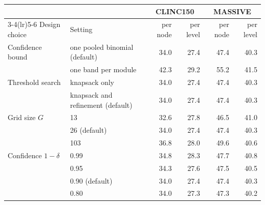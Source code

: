 \begin{tabular}{llrrrr}
\toprule
 & & \multicolumn{2}{c}{CLINC150} & \multicolumn{2}{c}{MASSIVE} \\
\cmidrule(lr){3-4}\cmidrule(lr){5-6}
Design choice & Setting & per node & per level & per node & per level \\
\midrule
Confidence bound & one pooled binomial (default) & 34.0 & 27.4 & 47.4 & 40.3 \\
 & one band per module & 42.3 & 29.2 & 55.2 & 41.5 \\
\midrule
Threshold search & knapsack only & 34.0 & 27.4 & 47.4 & 40.3 \\
 & knapsack and refinement (default) & 34.0 & 27.4 & 47.4 & 40.3 \\
\midrule
Grid size $G$ & 13 & 32.6 & 27.8 & 46.5 & 41.0 \\
 & 26 (default) & 34.0 & 27.4 & 47.4 & 40.3 \\
 & 103 & 36.8 & 28.0 & 49.6 & 40.6 \\
\midrule
Confidence $1-\delta$ & 0.99 & 34.8 & 28.3 & 47.7 & 40.8 \\
 & 0.95 & 34.3 & 27.6 & 47.5 & 40.5 \\
 & 0.90 (default) & 34.0 & 27.4 & 47.4 & 40.3 \\
 & 0.80 & 34.0 & 27.3 & 47.3 & 40.2 \\
\bottomrule
\end{tabular}
